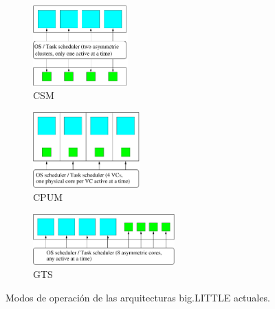 \begin{figure}%
 \centering
  \begin{subfigure}{.75\textwidth}
   \centering
   \includegraphics[width=0.4\textwidth]{Figures/Models/clustered.pdf}
   \caption{CSM}
  \end{subfigure}

	\medskip

  \begin{subfigure}{.75\textwidth}
   \centering
   \includegraphics[width=0.45\textwidth]{Figures/Models/iks.pdf}
   \caption{CPUM}
  \end{subfigure}

	\medskip

  \begin{subfigure}{.75\textwidth}
   \centering
   \includegraphics[width=0.6\textwidth]{Figures/Models/gts.pdf}
   \caption{GTS}
  \end{subfigure}
   \caption{Modos de operación de las arquitecturas big.LITTLE actuales.}
   \label{fig:modes}
\end{figure}



